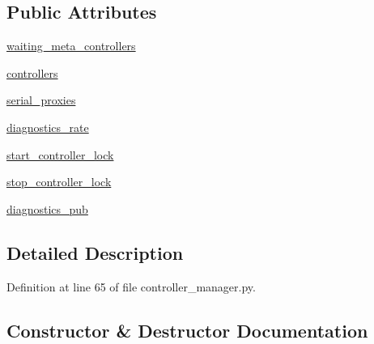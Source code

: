 \subsection*{Public Attributes}
\begin{DoxyCompactItemize}
\item 
\hyperlink{classcontroller__manager_1_1_controller_manager_a10faf09a5de3efe436c7862fee2d9709}{waiting\+\_\+meta\+\_\+controllers}
\item 
\hyperlink{classcontroller__manager_1_1_controller_manager_afb31b7117fd61c9c7431b47cfcddb962}{controllers}
\item 
\hyperlink{classcontroller__manager_1_1_controller_manager_adbee940432e0e6fe3f97b2eab6be6285}{serial\+\_\+proxies}
\item 
\hyperlink{classcontroller__manager_1_1_controller_manager_a8bc4abdce61030b2c80b29987d25a745}{diagnostics\+\_\+rate}
\item 
\hyperlink{classcontroller__manager_1_1_controller_manager_a3c9bc2258eb592e26334d69ff9d205ec}{start\+\_\+controller\+\_\+lock}
\item 
\hyperlink{classcontroller__manager_1_1_controller_manager_a974bae4de69c9ccb568def314be7d6b6}{stop\+\_\+controller\+\_\+lock}
\item 
\hyperlink{classcontroller__manager_1_1_controller_manager_a262f444500bd45723b7945fd24e07d18}{diagnostics\+\_\+pub}
\end{DoxyCompactItemize}


\subsection{Detailed Description}


Definition at line 65 of file controller\+\_\+manager.\+py.



\subsection{Constructor \& Destructor Documentation}
\mbox{\label{classcontroller__manager_1_1_controller_manager_a92e6e1983e89e13d96ead32a5d311655}} 
